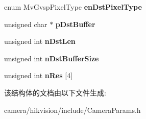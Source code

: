 \begin{DoxyCompactItemize}
enum Mv\+Gvsp\+Pixel\+Type {\bfseries en\+Dst\+Pixel\+Type}
\item 
\mbox{\label{struct___m_v___p_i_x_e_l___c_o_n_v_e_r_t___p_a_r_a_m___t___ab984a56eba85206960ca5c7eb9e7e40f}} 
unsigned char $\ast$ {\bfseries p\+Dst\+Buffer}
\item 
\mbox{\label{struct___m_v___p_i_x_e_l___c_o_n_v_e_r_t___p_a_r_a_m___t___aa911cd52978b3762857ca3658bbd6d3d}} 
unsigned int {\bfseries n\+Dst\+Len}
\item 
\mbox{\label{struct___m_v___p_i_x_e_l___c_o_n_v_e_r_t___p_a_r_a_m___t___aa51f14c349b5a251fc3f66dba64291c9}} 
unsigned int {\bfseries n\+Dst\+Buffer\+Size}
\item 
\mbox{\label{struct___m_v___p_i_x_e_l___c_o_n_v_e_r_t___p_a_r_a_m___t___a4a2bd2160a895ea3083c1e3fe2c728a6}} 
unsigned int {\bfseries n\+Res} \mbox{[}4\mbox{]}
\end{DoxyCompactItemize}


该结构体的文档由以下文件生成\+:\begin{DoxyCompactItemize}
\item 
camera/hikvision/include/Camera\+Params.\+h\end{DoxyCompactItemize}
